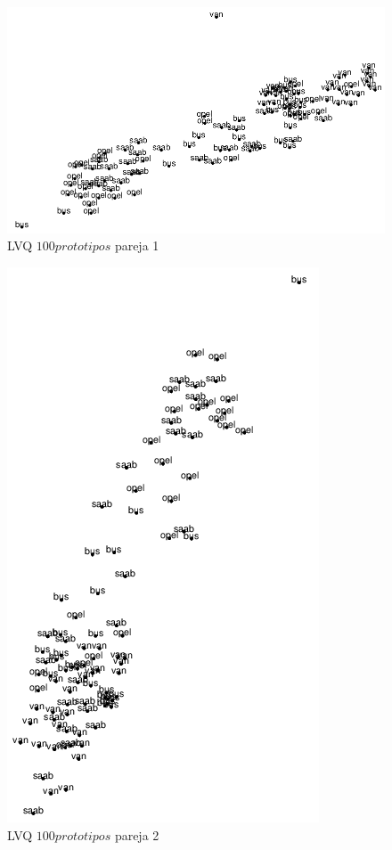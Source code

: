 \documentclass[11pt,spanish,listoffigures,listoftables]{workluis}
\begin{document}
\begin{figure}[H]
\centering
\includegraphics[scale=0.5]{lvq100p1}
\caption{LVQ $100 prototipos$ pareja 1}
\end{figure} 

\begin{figure}[H]
\centering
\includegraphics[scale=0.5]{lvq100p2}
\caption{LVQ $100 prototipos$ pareja 2}
\end{figure} 
\end{document}
